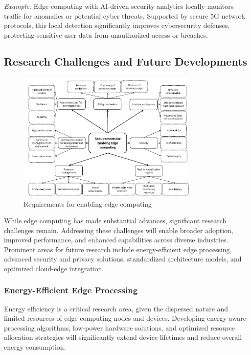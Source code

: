 \documentclass[runningheads]{llncs}
\begin{document}
\noindent\textit{Example:} Edge computing with AI-driven security analytics locally monitors traffic for anomalies or potential cyber threats. Supported by secure 5G network protocols, this local detection significantly improves cybersecurity defenses, protecting sensitive user data from unauthorized access or breaches.



\subsection{Research Challenges and Future Developments}

\begin{figure}[ht]
    \centering
    \includegraphics[width=0.8\textwidth]{IMG/2.png}
    \caption{Requirements for enabling edge computing}
    \label{fig:edge_requirements}
    \end{figure} 
\FloatBarrier

While edge computing has made substantial advances, significant research challenges remain. Addressing these challenges will enable broader adoption, improved performance, and enhanced capabilities across diverse industries. Prominent areas for future research include energy-efficient edge processing, advanced security and privacy solutions, standardized architecture models, and optimized cloud-edge integration.


\subsubsection{Energy-Efficient Edge Processing}
Energy efficiency is a critical research area, given the dispersed nature and limited resources of edge computing nodes and devices. Developing energy-aware processing algorithms, low-power hardware solutions, and optimized resource allocation strategies will significantly extend device lifetimes and reduce overall energy consumption.
\end{document}

